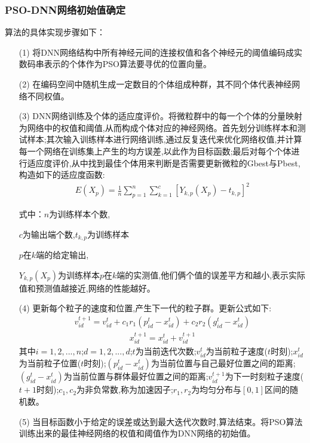 \documentclass{whutmod}
\begin{document}
	\subsubsection{PSO-DNN网络初始值确定}
	算法的具体实现步骤如下：
	\begin{itemize}
		\item [(1)]将DNN网络结构中所有神经元间的连接权值和各个神经元的阈值编码成实数码串表示的个体作为PSO算法要寻优的位置向量。
		\item [(2)]在编码空间中随机生成一定数目的个体组成种群，其不同个体代表神经网络不同权值。
		\item [(3)]DNN网络训练及个体的适应度评价。将微粒群中的每一个个体的分量映射为网络中的权值和阈值,从而构成个体对应的神经网络。首先划分训练样本和测试样本;其次输入训练样本进行网络训练,通过反复迭代来优化网络权值,并计算每一个网络在训练集上产生的均方误差,以此作为目标函数;最后对每个个体进行适应度评价,从中找到最佳个体用来判断是否需要更新微粒的Gbest与Pbest,构造如下的适应度函数:
			\begin{gather}
		E\left(X_{p}\right)=\frac{1}{n} \sum_{p=1}^{n} \sum_{k=1}^{c}\left[Y_{k, p}\left(X_{p}\right)-t_{k, p}\right]^{2}
		\end{gather}
		
		式中：$n$为训练样本个数,
		
		$c$为输出端个数,$t_{k,p}$为训练样本
		
		$p$在$k$端的给定输出,
		
		$Y_{k, p}\left(X_{p}\right)$为训练样本$p$在$k$端的实测值,他们俩个值的误差平方和越小,表示实际值和预测值越接近,网络的性能越好。
			
		\item [(4)]更新每个粒子的速度和位置,产生下一代的粒子群。更新公式如下:
		\begin{gather}
		v_{id}^{t+1}=v_{id}^{t}+c_{1}r_{1}(p_{id}^{t}-x_{id}^{t})+c_{2}r_{2}(g_{id}^{t}-x_{id}^{t})
		\end{gather}	
		\begin{gather}
		x_{id}^{t+1}=x_{id}^{t}+v_{id}^{t+1}
		\end{gather}
		其中$i=1,2,...,n$;$d=1,2,...,d$;$t$为当前迭代次数;$v_{id}^{t}$为当前粒子速度($t$时刻);$x_{id}^{t}$为当前粒子位置($t$时刻);$(p_{id}^{t}-x_{id}^{t})$为当前位置与自己最好位置之间的距离;$(g_{id}^{t}-x_{id}^{t})$为当前位置与群体最好位置之间的距离;$v_{id}^{t+1}$为下一时刻粒子速度($t+1$时刻);$c_{1},c_{2}$为非负常数,称为加速因子;$r_{1},r_{2}$为均匀分布与$[0,1]$区间的随机数。
		
		\item [(5)]当目标函数小于给定的误差或达到最大迭代次数时,算法结束。将PSO算法训练出来的最佳神经网络的权值和阈值作为DNN网络的初始值。
		
		
	
	\end{itemize}
	
\end{document}

